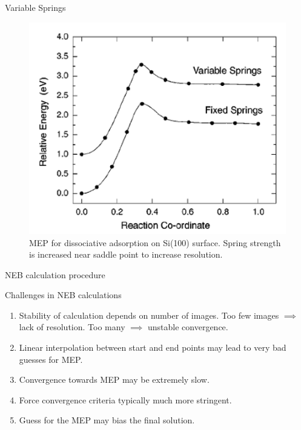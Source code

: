 \documentclass[aspectratio=169]{beamer}
\begin{document}
\begin{frame}{Variable Springs}

\begin{figure}
    \centering
    \includegraphics[width=0.4\linewidth]{lectures/figures/12-variable_springs.png}
    \caption{MEP for  dissociative adsorption on Si(100) surface. Spring strength is increased near saddle point to increase resolution.\cite{henkelmanClimbingImageNudged2000}}
\end{figure} 
\end{frame} 

\begin{frame}{NEB calculation procedure}
\begin{figure}
    \centering
\end{figure} 
\end{frame} 

\begin{frame}{Challenges in NEB calculations}
\begin{enumerate}
    \item Stability of calculation depends on number of images. Too few images $\implies$ lack of resolution. Too many $\implies$ unstable convergence.
    \item Linear interpolation between start and end points may lead to very bad guesses for MEP. 
    \item Convergence towards MEP may be extremely slow.
    \item Force convergence criteria typically much more stringent.
    \item Guess for the MEP may bias the final solution.
\end{enumerate}
\end{frame} 
\end{document}
